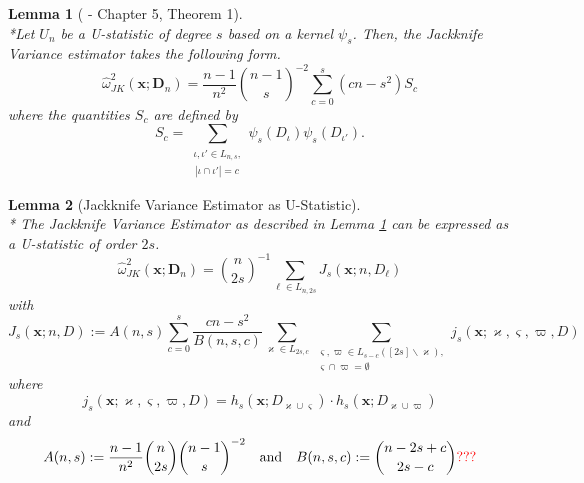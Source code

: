 \documentclass[letterpaper,10pt]{article}
\numberwithin{equation}{section}
\numberwithin{thm}{section}
\newtheorem{lem}{Lemma}
\numberwithin{lem}{section}
\numberwithin{cor}{section}
\renewcommand{\hat}{\widehat}
\newcommand{\1}{\mathbbm{1}}
\begin{document}
\begin{lem}[\citet{lee_u-statistics_2019} - Chapter 5, Theorem 1]\mbox{}\\*\label{Lee_ch5thm1}
	Let $U_n$ be a U-statistic of degree $s$ based on a kernel $\psi_s$.
	Then, the Jackknife Variance estimator takes the following form.
	\begin{equation}
		\hat{\omega}^{2}_{JK}\left(\mathbf{x}; \mathbf{D}_n\right)
		= \frac{n-1}{n^2}\binom{n-1}{s}^{-2}\sum_{c = 0}^{s}\left(cn - s^2\right)S_c
	\end{equation}
	where the quantities $S_c$ are defined by
	\begin{equation}
		S_c
		= \sum_{\substack{\iota, \iota' \in L_{n,s}, \\ \, |\iota \cap \iota'| = c}}
		\psi_{s}(D_{\iota})\psi_{s}(D_{\iota'}).
	\end{equation}
\end{lem}

\begin{lem}[Jackknife Variance Estimator as U-Statistic]\label{JK_as_U_Stat}\mbox{}\\*
	The Jackknife Variance Estimator as described in Lemma \ref{Lee_ch5thm1} can be expressed as a U-statistic of order $2s$.
	\begin{equation}
		\hat{\omega}^{2}_{JK}\left(\mathbf{x}; \mathbf{D}_n\right)
		= \binom{n}{2s}^{-1} \sum_{\ell \in L_{n, 2 s}}J_{s}\left(\mathbf{x}; n, D_\ell\right)
	\end{equation}
	with
	\begin{equation}
		J_{s}\left(\mathbf{x}; n, D\right)
		:= A(n, s)
		\sum_{c = 0}^{s} \frac{cn - s^2}{B(n, s, c)}
		\sum_{\varkappa \in L_{2 s, c}}
		\sum_{\substack{\varsigma, \varpi \in L_{s - c}([2 s] \backslash \varkappa),\\
				\varsigma \cap \varpi = \emptyset}}
		j_{s}\left(\mathbf{x}; \varkappa, \varsigma, \varpi, D\right)
	\end{equation}
	where
	\begin{equation}
		j_{s}\left(\mathbf{x}; \varkappa, \varsigma, \varpi, D\right) =
		h_{s}(\mathbf{x}; D_{\varkappa \cup \varsigma}) \cdot
		h_{s}(\mathbf{x};D_{\varkappa \cup \varpi})
	\end{equation}
	and
	\begin{equation}
		A(n, s) := \frac{n-1}{n^2} \binom{n}{2s} \binom{n-1}{s}^{-2}
		\quad \text{and} \quad
		B(n, s, c) := \binom{n-2s+c}{2s - c}{\color{red} \text{???}}
	\end{equation}
\end{lem}
\end{document}
